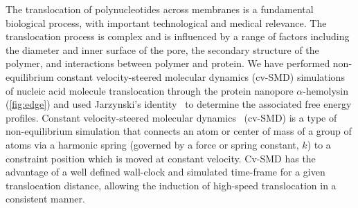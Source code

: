 \documentclass[a4paper,10pt]{article}
\begin{document}
The translocation of polynucleotides across membranes is a fundamental
biological process, with important technological and medical
relevance.  The translocation process is complex and is influenced by
a range of factors including the diameter and inner surface of the
pore, the secondary structure of the polymer, and interactions between
polymer and protein. We have performed non-equilibrium constant
velocity-steered molecular dynamics (cv-SMD) simulations of nucleic
acid molecule translocation through the protein nanopore
$\alpha$-hemolysin (\ref{fig:edge}) and used Jarzynski's
identity~\cite{jarzynski1997nef} to determine the associated free
energy profiles. Constant velocity-steered molecular
dynamics~\cite{phillips2005smd} (cv-SMD) is a type of non-equilibrium
simulation that connects an atom or center of mass of a group of atoms
via a harmonic spring (governed by a force or spring constant, $k$) to
a constraint position which is moved at constant velocity. Cv-SMD has
the advantage of a well defined wall-clock and simulated time-frame
for a given translocation distance, allowing the induction of
high-speed translocation in a consistent manner.
\end{document}
